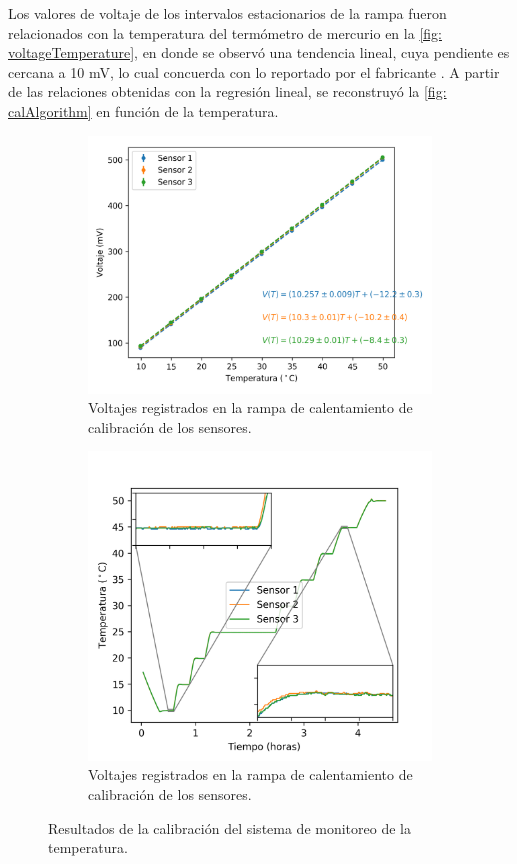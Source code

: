 	Los valores de voltaje de los intervalos estacionarios de la rampa fueron relacionados con la temperatura del termómetro de mercurio en la \autoref{fig: voltageTemperature}, en donde se observó una tendencia lineal, cuya pendiente es cercana a 10 mV, lo cual concuerda con lo reportado por el fabricante \cite{instruments1999lm35}. A partir de las relaciones obtenidas con la regresión lineal, se reconstruyó la \autoref{fig: calAlgorithm} en función de la temperatura.
	\begin{figure}[h]
		\centering
		\begin{subfigure}{0.45\linewidth}
			\includegraphics[width=\linewidth]{../Data/TemperatureCalibration/V-T}
			\caption{Voltajes registrados en la rampa de calentamiento de calibración de los sensores.}
		\end{subfigure}
		\begin{subfigure}{0.45\linewidth}
			\includegraphics[width=\linewidth]{../Data/TemperatureCalibration/T-t}
			\caption{Voltajes registrados en la rampa de calentamiento de calibración de los sensores.}
		\end{subfigure}
		\caption{Resultados de la calibración del sistema de monitoreo de la temperatura.}
		\label{fig: voltageTemperature}
	\end{figure}
